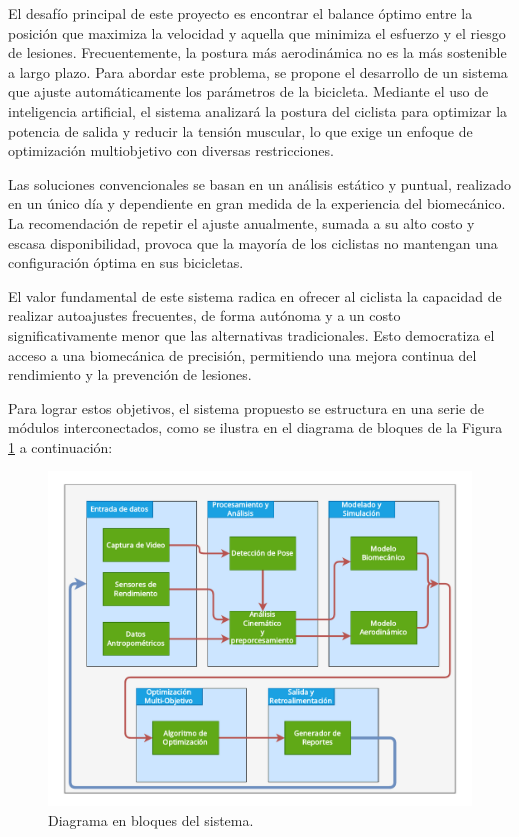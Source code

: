 \documentclass[
11pt, %
]{charter}
\begin{document}
El desafío principal de este proyecto es encontrar el balance óptimo entre la posición que maximiza la velocidad y aquella que minimiza el esfuerzo y el riesgo de lesiones. Frecuentemente, la postura más aerodinámica no es la más sostenible a largo plazo. Para abordar este problema, se propone el desarrollo de un sistema que ajuste automáticamente los parámetros de la bicicleta. Mediante el uso de inteligencia artificial, el sistema analizará la postura del ciclista para optimizar la potencia de salida y reducir la tensión muscular, lo que exige un enfoque de optimización multiobjetivo con diversas restricciones.

Las soluciones convencionales se basan en un análisis estático y puntual, realizado en un único día y dependiente en gran medida de la experiencia del biomecánico. La recomendación de repetir el ajuste anualmente, sumada a su alto costo y escasa disponibilidad, provoca que la mayoría de los ciclistas no mantengan una configuración óptima en sus bicicletas.

El valor fundamental de este sistema radica en ofrecer al ciclista la capacidad de realizar autoajustes frecuentes, de forma autónoma y a un costo significativamente menor que las alternativas tradicionales. Esto democratiza el acceso a una biomecánica de precisión, permitiendo una mejora continua del rendimiento y la prevención de lesiones.

Para lograr estos objetivos, el sistema propuesto se estructura en una serie de módulos interconectados, como se ilustra en el diagrama de bloques de la Figura \ref{fig:diagBloques} a continuación:

\begin{figure}[htpb]
\centering
\includegraphics[width=.65\textwidth]{./Figuras/Diagrama_de_Bloques_proyecto_ciclista.pdf}
\caption{Diagrama en bloques del sistema.}
\label{fig:diagBloques}
\end{figure}
\end{document}
